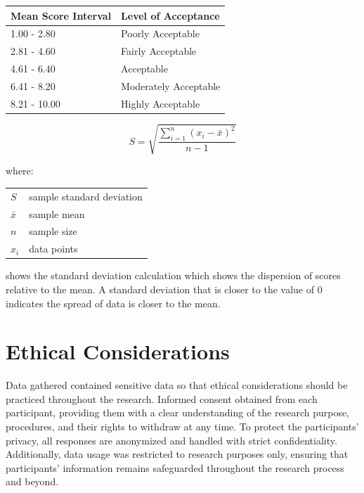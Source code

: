 	
	\begin{table}[h]
		\centering
		\renewcommand{\arraystretch}{1.3}
		\label{Verbal}
			\begin{tabular}{ll}
				\multicolumn{1}{l}{\textbf{Mean Score Interval}} & 
				\multicolumn{1}{l}{\textbf{Level of Acceptance}} \\ \hline
				1.00 - 2.80     & Poorly Acceptable            \\ 
				2.81 - 4.60     & Fairly Acceptable  \\ 
				4.61 - 6.40     & Acceptable \\ 
				6.41 - 8.20     & Moderately Acceptable      \\ 
				8.21 - 10.00    & Highly Acceptable\\ 
			\end{tabular}
	\end{table}
	
	
	\begin{equation*} 
		\label{stdDev}
		S = \sqrt{\frac{\sum_{i=1}^{n} (x_{i} - \bar{x} )^2 }{n-1}}
	\end{equation*}
	
	\noindent where: \\
	\begin{tabular}{@{}ll}
	$S$ & sample standard deviation \\
	$\bar{x}$ & sample mean \\
	$n$ & sample size \\
	$x_{i}$ & data points \\
	\end{tabular}
		
	\noindent shows the standard deviation calculation which shows the dispersion of scores relative to the mean. A standard deviation  that is closer to the value of 0 indicates the spread of data is closer to the mean.


\section{Ethical Considerations}
	Data gathered contained sensitive data so that ethical considerations should be practiced throughout the research.  Informed consent obtained from each participant, providing them with a clear understanding of the research purpose, procedures, and their rights to withdraw at any time. To protect the participants’ privacy, all responses are anonymized and handled with strict confidentiality. Additionally, data usage was restricted to research purposes only, ensuring that participants' information remains safeguarded throughout the research process and beyond. 
	
